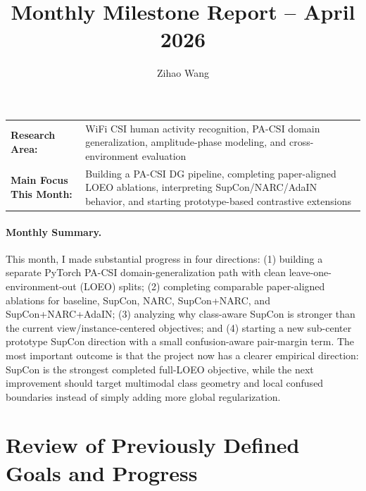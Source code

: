 \documentclass[11pt]{article}
\title{Monthly Milestone Report -- April 2026}
\author{Zihao Wang}
\date{}
\begin{document}
\maketitle

\noindent\begin{tabular}{@{}>{\bfseries}p{1.35in}p{4.75in}@{}}
Research Area: & WiFi CSI human activity recognition, PA-CSI domain generalization, amplitude-phase modeling, and cross-environment evaluation \\
Main Focus This Month: & Building a PA-CSI DG pipeline, completing paper-aligned LOEO ablations, interpreting SupCon/NARC/AdaIN behavior, and starting prototype-based contrastive extensions \\
\end{tabular}

\paragraph{Monthly Summary.}
This month, I made substantial progress in four directions: (1) building a separate PyTorch PA-CSI domain-generalization path with clean leave-one-environment-out (LOEO) splits; (2) completing comparable paper-aligned ablations for baseline, SupCon, NARC, SupCon+NARC, and SupCon+NARC+AdaIN; (3) analyzing why class-aware SupCon is stronger than the current view/instance-centered objectives; and (4) starting a new sub-center prototype SupCon direction with a small confusion-aware pair-margin term. The most important outcome is that the project now has a clearer empirical direction: SupCon is the strongest completed full-LOEO objective, while the next improvement should target multimodal class geometry and local confused boundaries instead of simply adding more global regularization.

\section{Review of Previously Defined Goals and Progress}
\end{document}
